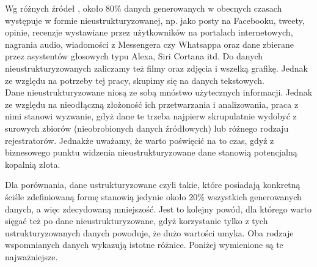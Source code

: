 


\noindent Wg różnych źródeł \cite{unstructuredData}, około 80\% danych generowanych w obecnych czasach występuje w formie nieustrukturyzowanej, np. jako posty na Facebooku, tweety, opinie, recenzje wystawiane przez użytkowników na portalach internetowych, nagrania audio, wiadomości z Messengera czy Whatsappa oraz dane zbierane przez asystentów głosowych typu Alexa, Siri Cortana itd.
Do danych nieustrukturyzowanych zaliczamy też filmy oraz zdjęcia i wszelką grafikę.
Jednak ze względu na potrzeby tej pracy, skupimy się na danych tekstowych. \\

\noindent Dane nieustrukturyzowane niosą ze sobą mnóstwo użytecznych informacji. Jednak ze względu na nieodłączną złożoność ich przetwarzania i analizowania, praca z nimi stanowi wyzwanie, gdyż dane te trzeba najpierw skrupulatnie wydobyć z surowych zbiorów (nieobrobionych danych źródłowych) lub różnego rodzaju rejestratorów. Jednakże uważamy, że warto poświęcić na to czas, gdyż z biznesowego punktu widzenia nieustrukturyzowane dane stanowią potencjalną kopalnią złota.

\noindent Dla porównania, dane ustrukturyzowane czyli takie, które posiadają konkretną ściśle zdefiniowaną formę stanowią jedynie około 20\% wszystkich generowanych danych, a więc zdecydowaną mniejszość. Jest to kolejny powód, dla którego warto sięgać też po dane nieustrukturyzowane, gdyż korzystanie tylko z tych ustrukturyzowanych danych powoduje, że dużo wartości umyka.
Oba rodzaje wspomnianych danych wykazują istotne różnice. Poniżej wymienione są te najważniejsze.

